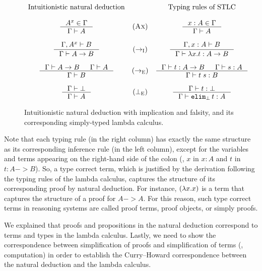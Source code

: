 \begin{figure}
\[
\begin{array}{ccc}
        \text{Intuitionistic natural deduction} & &
        \text{Typing rules of STLC} \\ \\
\inference{A^x \in \Gamma}{\Gamma |- A} & (\textsc{Ax}) &
\inference{x:A \in \Gamma}{\Gamma |- A} \\ \\
\inference{\Gamma,A^x |- B}{\Gamma |- A -> B} & (->_\textsc{I}) &
\inference{\Gamma,x:A |- B}{\Gamma |- \l x.t : A -> B} \\ \\
\inference{\Gamma |- A -> B & \Gamma |- A}{\Gamma |- B} & (->_\textsc{E}) &
\inference{\Gamma |- t : A -> B & \Gamma |- s : A}{\Gamma |- t\;s : B} \\ \\
\inference{\Gamma |- \bot}{\Gamma |- A} & (\bot_\textsc{E})  &
\inference{\Gamma |- t:\bot}{\Gamma |- \texttt{elim}_\bot\,t : A}
\end{array}
\]
\caption{Intuitionistic natural deduction with implication and falsity,
        and its corresponding simply-typed lambda calculus.}
\label{fig:nd}
\end{figure}

Note that each typing rule (in the right column) has exactly the same structure
as its corresponding inference rule (in the left column), except for
the variables and terms appearing on the right-hand side of the colon
(\eg, $x$ in $x:A$ and $t$ in $t:A -> B$). So, a type correct term,
which is justified by the derivation following the typing rules of
the lambda calculus, captures the structure of its corresponding proof
by natural deduction. For instance, $(\lambda x. x)$ is a term that captures
the structure of a proof for $A -> A$.
For this reason, such type correct terms in reasoning systems
are called proof terms, proof objects, or simply proofs.

We explained that proofs and propositions in the natural deduction
correspond to terms and types in the lambda calculus. Lastly,
we need to show the correspondence between simplification of proofs
and simplification of terms (\ie, computation) in order to establish
the Curry--Howard correspondence between the natural deduction
and the lambda calculus.


